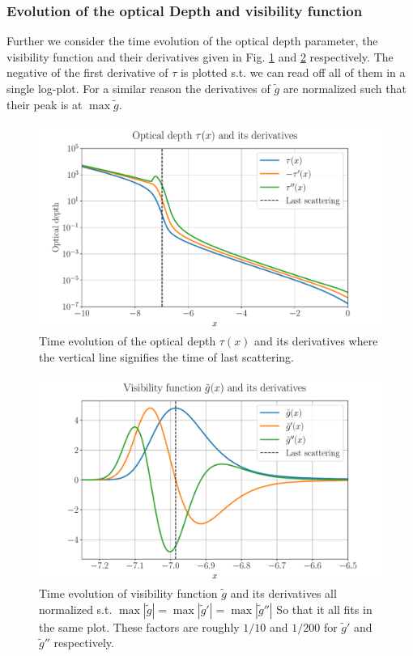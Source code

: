 \documentclass[%
reprint,
 amsmath,amssymb,
 aps,
]{revtex4-2}
\begin{document}
\subsubsection{Evolution of the optical Depth and visibility function}
Further we consider the time evolution of the optical depth parameter, the visibility function and their derivatives given in Fig. \ref{fig:tau} and \ref{fig:gtilde} respectively. The negative of the first derivative of $\tau$ is plotted s.t. we can read off all of them in a single log-plot. For a similar reason the derivatives of $\tilde g$ are normalized such that their peak is at $\max\tilde g$. 
\begin{figure}[ht!]
	\includegraphics[width = \linewidth]{Figures/tau_and_derivs.pdf}
	\caption{Time evolution of the optical depth $\tau(x)$ and its derivatives where the vertical line signifies the time of last scattering.}
	\label{fig:tau}
\end{figure}
\begin{figure}[ht!]
	\includegraphics[width = \linewidth]{Figures/gtilde.pdf}
	\caption{Time evolution of visibility function $\tilde g$ and its derivatives all normalized s.t. $\max|\tilde g|=\max|\tilde g'|=\max|\tilde g''|$ So that it all fits in the same plot. These factors are roughly $1/10$ and $1/200$ for $\tilde g'$ and $\tilde g''$ respectively.}
	\label{fig:gtilde}
\end{figure}
\end{document}
